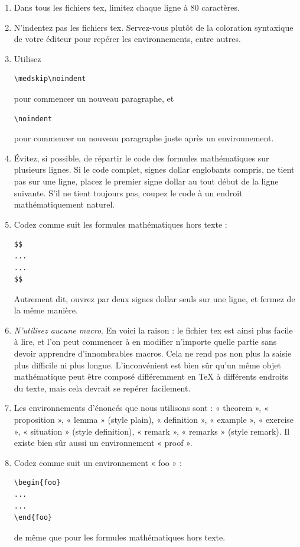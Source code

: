 \begin{enumerate}
\item Dans tous les fichiers tex, limitez chaque ligne à 80 caractères.
\item N'indentez pas les fichiers tex. Servez-vous plutôt de la coloration
syntaxique de votre éditeur pour repérer les environnements, entre autres.
\item Utilisez
\begin{verbatim}
\medskip\noindent
\end{verbatim}
pour commencer un nouveau paragraphe, et
\begin{verbatim}
\noindent
\end{verbatim}
pour commencer un nouveau paragraphe juste après un environnement.
\item Évitez, si possible, de répartir le code des formules mathématiques sur
plusieurs lignes. Si le code complet, signes dollar englobants compris, ne
tient pas sur une ligne, placez le premier signe dollar au tout début de la
ligne suivante. S'il ne tient toujours pas, coupez le code à un endroit
mathématiquement naturel.
\item Codez comme suit les formules mathématiques hors texte :
\begin{verbatim}
$$
...
...
$$
\end{verbatim}
Autrement dit, ouvrez par deux signes dollar seuls sur une ligne, et fermez
de la même manière.
\item {\it N'utilisez aucune macro}. En voici la raison : le fichier tex est
ainsi plus facile à lire, et l'on peut commencer à en modifier n'importe
quelle partie sans devoir apprendre d'innombrables macros.
Cela ne rend pas non plus la saisie plus difficile ni plus longue.
L'inconvénient est bien sûr qu'un même objet mathématique peut être composé
différemment en TeX à différents endroits du texte, mais cela devrait se
repérer facilement.
\item Les environnements d'énoncés que nous utilisons sont :
« theorem », « proposition », « lemma » (style plain),
« definition », « example », « exercise », « situation »
(style definition), « remark », « remarks » (style remark).
Il existe bien sûr aussi un environnement « proof ».
\item Codez comme suit un environnement « foo » :
\begin{verbatim}
\begin{foo}
...
...
\end{foo}
\end{verbatim}
de même que pour les formules mathématiques hors texte.

\end{enumerate}
